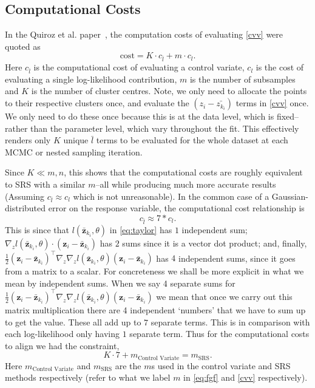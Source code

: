 \subsection{Computational Costs}\label{sec:computational_costs}
In the Quiroz et al. paper~\cite{Quiroz_2018}, the computation costs of evaluating \cref{cvv} were quoted as
%
\begin{equation}
\mathrm{cost} = K \cdot c_{\bar{l}} + m \cdot c_{l}.
\end{equation}
Here  $c_{\bar{l}}$ is the computational cost of evaluating a control variate, $c_{l}$ is the cost of evaluating a single log-likelihood contribution, $m$ is the number of subsamples and $K$ is the number of cluster centres. Note, we only need to allocate the points to their respective clusters once, and evaluate the $(z_i-\bar{z_{k_i}})$ terms in \cref{cvv} once. We only need to do these once because this is at the data level, which is fixed--rather than the parameter level, which vary throughout the fit. This effectively renders only $K$ unique $\bar{l}$ terms to be evaluated for the whole dataset at each MCMC or nested sampling iteration.

Since $K \ll m,n$, this shows that the computational costs are roughly equivalent to SRS with a similar $m$--all while producing much more accurate results (Assuming $c_{\bar{l}} \approx c_{l}$ which is not unreasonable). In the common case of a Gaussian-distributed error on the response variable, the computational cost relationship is 
%
\begin{equation}
    c_{\bar{l}} \approx 7*c_{l}.
\end{equation}
%
This is since that $l(\bar{\textbf{z}}_{k_{i}},\theta)$ in \cref{eq:taylor} has $1$ independent sum; $\nabla_z l(\bar{\textbf{z}}_{k_{i}},\theta) \cdot (\textbf{z}_i-\bar{\textbf{z}}_{k_{i}})$ has $2$ sums since it is a vector dot product; and, finally, $\frac{1}{2}(\textbf{z}_i-\bar{\textbf{z}}_{k_{i}})^\intercal  \nabla_z \nabla_z l(\bar{\textbf{z}}_{k_{i}},\theta)(\textbf{z}_i-\bar{\textbf{z}}_{k_{i}})$ has $4$ independent sums, since it goes from a matrix to a scalar. For concreteness we shall be more explicit in what we mean by independent sums. When we say 4 separate sums for $\frac{1}{2}(\textbf{z}_i-\bar{\textbf{z}}_{k_{i}})^\intercal  \nabla_z \nabla_z l(\bar{\textbf{z}}_{k_{i}},\theta)(\textbf{z}_i-\bar{\textbf{z}}_{k_{i}})$ we mean that once we carry out this matrix multiplication there are 4 independent `numbers' that we have to sum up to get the value. These all add up to $7$ separate terms. This is in comparison with each log-likelihood only having $1$ separate term. Thus for the computational costs to align we had the constraint,
%
\begin{equation}
    K \cdot 7 + m_{\textrm{Control Variate}}= m_{\textrm{SRS}}.
\end{equation}
%
Here $m_{\textrm{Control Variate}}$ and $m_{\textrm{SRS}}$ are the $m$s used in the control variate and SRS methods respectively (refer to what we label $m$ in \cref{eq:fgf} and \cref{cvv} respectively). 



